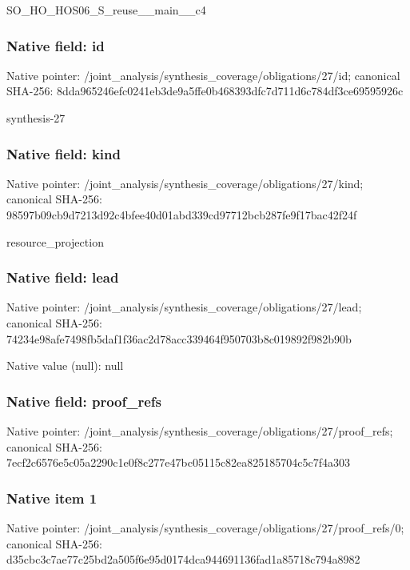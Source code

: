 \documentclass[10pt,a4paper]{article}
\begin{document}
\begingroup\raggedright\sloppy SO\_\allowbreak{}HO\_\allowbreak{}HOS06\_\allowbreak{}S\_\allowbreak{}reuse\_\allowbreak{}\_\allowbreak{}main\_\allowbreak{}\_\allowbreak{}c4\par\endgroup

\subsubsection{Native field: id}
Native pointer: /joint\_\allowbreak{}analysis/synthesis\_\allowbreak{}coverage/obligations/27/id; canonical SHA-256: 8dda965246efc0241eb3de9a5ffe0b468393dfc7d711d6c784df3ce69595926c

\begingroup\raggedright\sloppy synthesis-27\par\endgroup

\subsubsection{Native field: kind}
Native pointer: /joint\_\allowbreak{}analysis/synthesis\_\allowbreak{}coverage/obligations/27/kind; canonical SHA-256: 98597b09cb9d7213d92c4bfee40d01abd339cd97712bcb287fe9f17bac42f24f

\begingroup\raggedright\sloppy resource\_\allowbreak{}projection\par\endgroup

\subsubsection{Native field: lead}
Native pointer: /joint\_\allowbreak{}analysis/synthesis\_\allowbreak{}coverage/obligations/27/lead; canonical SHA-256: 74234e98afe7498fb5daf1f36ac2d78acc339464f950703b8c019892f982b90b

Native value (null): null

\subsubsection{Native field: proof\_\allowbreak{}refs}
Native pointer: /joint\_\allowbreak{}analysis/synthesis\_\allowbreak{}coverage/obligations/27/proof\_\allowbreak{}refs; canonical SHA-256: 7ecf2c6576e5c05a2290c1e0f8c277e47bc05115c82ea825185704c5c7f4a303

\subsubsection{Native item 1}
Native pointer: /joint\_\allowbreak{}analysis/synthesis\_\allowbreak{}coverage/obligations/27/proof\_\allowbreak{}refs/0; canonical SHA-256: d35cbc3c7ae77c25bd2a505f6e95d0174dca944691136fad1a85718c794a8982
\end{document}

